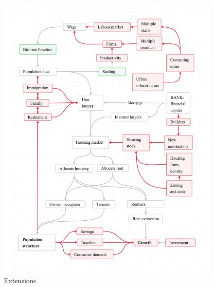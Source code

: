 \begin{figure} 
\vspace{-4.5cm}
\begin{adjustwidth}{-0.24\textwidth}{-0.2\textwidth}
\centering
\includegraphics[scale=.20]{fig/extensions3.png}
\end{adjustwidth}
\caption{Extensions}
\label{fig-extensions-logic}
\end{figure}

